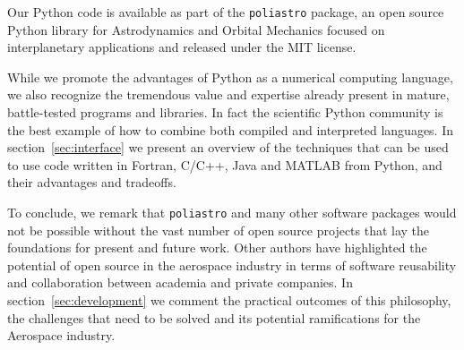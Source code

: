 Our Python code is available as part of the \verb|poliastro| package, an open source Python library for Astrodynamics and Orbital Mechanics focused on interplanetary applications and released under the MIT license\cite{Cano2016}.

While we promote the advantages of Python as a numerical computing language, we also recognize the tremendous value and expertise already present in mature, battle-tested programs and libraries. In fact the scientific Python community is the best example of how to combine both compiled and interpreted languages. In section~\ref{sec:interface} we present an overview of the techniques that can be used to use code written in Fortran, C/C++, Java and MATLAB from Python, and their advantages and tradeoffs.

To conclude, we remark that \verb|poliastro| and many other software packages would not be possible without the vast number of open source projects that lay the foundations for present and future work. Other authors have highlighted the potential of open source in the aerospace industry in terms of software reusability and collaboration between academia and private companies\citep{Ziemer2012}. In section~\ref{sec:development} we comment the practical outcomes of this philosophy, the challenges that need to be solved and its potential ramifications for the Aerospace industry.